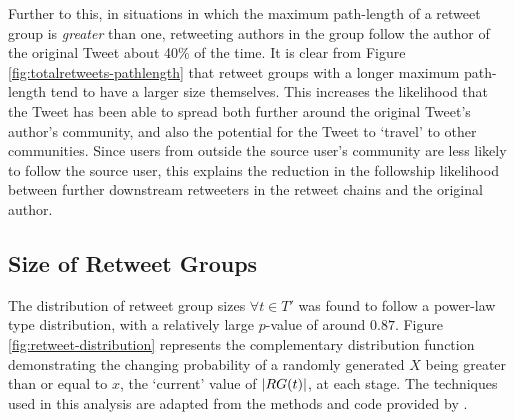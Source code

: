 
Further to this, in situations in which the maximum path-length of a retweet group is \textit{greater} than one, retweeting authors in the group follow the author of the original Tweet about 40\% of the time. It is clear from Figure \ref{fig:totalretweets-pathlength} that retweet groups with a longer maximum path-length tend to have a larger size themselves. This increases the likelihood that the Tweet has been able to spread both further around the original Tweet's author's community, and also the potential for the Tweet to `travel' to other communities. Since users from outside the source user's community are less likely to follow the source user, this explains the reduction in the followship likelihood between further downstream retweeters in the retweet chains and the original author.


\subsection{Size of Retweet Groups}
The distribution of retweet group sizes $\forall t \in T'$  was found to follow a power-law type distribution, with a relatively large $p$-value of around $0.87$. Figure \ref{fig:retweet-distribution} represents the complementary distribution function demonstrating the changing probability of a randomly generated $X$ being greater than or equal to $x$, the `current' value of $|RG(t)|$, at each stage. The techniques used in this analysis are adapted from the methods and code provided by \cite{clauset07}.

